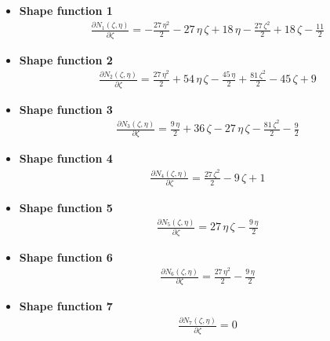 \documentclass{article}
\begin{document}
\begin{itemize}
	\item \textbf{Shape function 1}\newline
	\begin{align}
	\frac{\partial N_1(\zeta, \eta)}{\partial \zeta} = -\frac{27\,\eta ^2}{2}-27\,\eta \,\zeta+18\,\eta -\frac{27\,{\zeta}^2}{2}+18\,\zeta-\frac{11}{2}
	\end{align}
	
	
	\item \textbf{Shape function 2}\newline
	\begin{align}
	\frac{\partial N_2(\zeta, \eta)}{\partial \zeta} = \frac{27\,\eta ^2}{2}+54\,\eta \,\zeta-\frac{45\,\eta }{2}+\frac{81\,{\zeta}^2}{2}-45\,\zeta+9
	\end{align}
	
	
	\item \textbf{Shape function 3}\newline
	\begin{align}
	\frac{\partial N_3(\zeta, \eta)}{\partial \zeta} = \frac{9\,\eta }{2}+36\,\zeta-27\,\eta \,\zeta-\frac{81\,{\zeta}^2}{2}-\frac{9}{2}
	\end{align}
	
	
	\item \textbf{Shape function 4}\newline
	\begin{align}
	\frac{\partial N_4(\zeta, \eta)}{\partial \zeta} = \frac{27\,{\zeta}^2}{2}-9\,\zeta+1
	\end{align}
	
	
	\item \textbf{Shape function 5}\newline
	\begin{align}
	 \frac{\partial N_5(\zeta, \eta)}{\partial \zeta} = 27\,\eta \,\zeta-\frac{9\,\eta }{2}
	\end{align}
	
	
	\item \textbf{Shape function 6}\newline
	\begin{align}
	\frac{\partial N_6(\zeta, \eta)}{\partial \zeta} = \frac{27\,\eta ^2}{2}-\frac{9\,\eta }{2}
	\end{align}
	
	
	\item \textbf{Shape function 7}\newline
	\begin{align}
	\frac{\partial N_7(\zeta, \eta)}{\partial \zeta} = 0
	\end{align}
	

\end{itemize}
\end{document}
